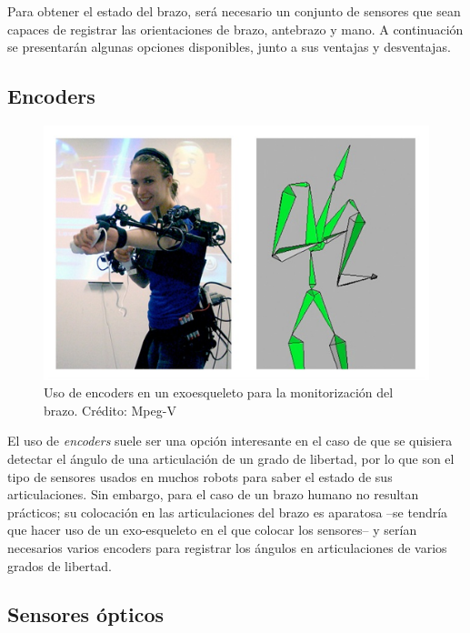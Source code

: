 \documentclass[12pt, a4paper]{report}
\begin{document}
Para obtener el estado del brazo, será necesario un conjunto de sensores que sean capaces de registrar las orientaciones de brazo, antebrazo y mano. A continuación se presentarán algunas opciones disponibles, junto a sus ventajas y desventajas.

\subsection{Encoders}

\begin{figure}
	\centering
		\includegraphics[scale=0.4]{../img/exoskeleton.png} 
	\caption[Uso de encoders en un exoesqueleto para la monitorización del brazo.]{Uso de encoders en un exoesqueleto para la monitorización del brazo. Crédito: Mpeg-V} 
	\label{fig: encoders}
\end{figure}

El uso de \textit{encoders} suele ser una opción interesante en el caso de que se quisiera detectar el ángulo de una articulación de un grado de libertad, por lo que son el tipo de sensores usados en muchos robots para saber el estado de sus articulaciones. Sin embargo, para el caso de un brazo humano no resultan prácticos; su colocación en las articulaciones del brazo es aparatosa --se tendría que hacer uso de un exo-esqueleto en el que colocar los sensores-- y serían necesarios varios encoders para registrar los ángulos en articulaciones de varios grados de libertad. 

\subsection{Sensores ópticos}
\end{document}
